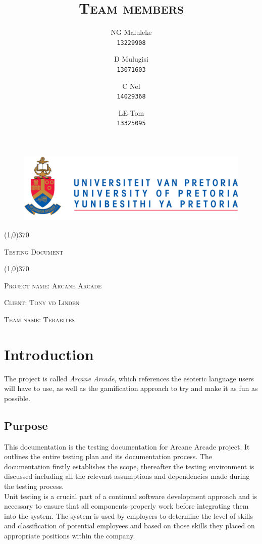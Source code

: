 \documentclass[english]{article}
\title{\scshape\Large Team members}
\author{
	NG Maluleke\\
	\texttt{13229908}
	\and
	D Mulugisi\\
	\texttt{13071603}
	\and
	C Nel\\
	\texttt{14029368}
	\and
	LE Tom\\
	\texttt{13325095}
}
\begin{document}
	
	\begin{figure}
		\includegraphics[width=\linewidth]{up_logo.png}
	\end{figure}
	
	\begin{center}
	 \line(1,0){370}
	\\[0.2cm]
    {\scshape\Large Testing Document \par}
	\vspace{0.1cm}
	\line(1,0){370}
	\\[0.8cm]
	
	{\scshape\large Project name: Arcane Arcade\par}	
	\vspace{1cm}
	{\scshape\large Client: Tony vd Linden\par}
	\vspace{1cm}
	{\scshape\large Team name: Terabites\par}
	\vspace{1cm}
	{\let\newpage\relax\maketitle}
	\end{center}
	
	
	\newpage
	\tableofcontents

	\newpage
	
	\section{Introduction}
		 The project is called \textit{Arcane Arcade}, which references the esoteric language users will have to use, as well as the gamification approach to try and make it as fun as possible.

	
		
		\subsection{Purpose}
			
			This documentation is the testing documentation for Arcane Arcade project. It outlines the entire testing plan and its documentation process. The documentation firstly establishes the scope, thereafter the testing environment is discussed including all the relevant assumptions and dependencies made during the testing process.\\
			Unit testing is a crucial part of a continual software development approach and is necessary to ensure that all components properly work before integrating them into the system. The system is used by employers to determine the level of skills and classification of potential employees and based on those skills they placed on appropriate positions within the company.
			
\end{document}
